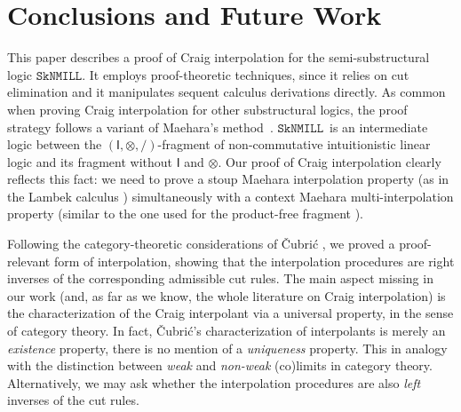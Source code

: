 \documentclass[sn-mathphys-num]{sn-jnl}%
\newcommand{\ot}{\otimes}
\newcommand{\unit}{\mathsf{I}}
\newcommand{\sls}{\slash}
\newcommand{\SkNMILL}{$\mathtt{SkNMILL}$}
\theoremstyle{thmstyleone}%
\theoremstyle{thmstyletwo}%
\theoremstyle{thmstylethree}%
\begin{document}
\section{Conclusions and Future Work}

This paper describes a proof of Craig interpolation for the semi-substructural logic \SkNMILL.
It employs proof-theoretic techniques, since it relies on cut elimination and it manipulates sequent calculus derivations directly.
As common when proving Craig interpolation for other substructural logics, the proof strategy follows a variant of Maehara's method~\cite{maehara1961}.
\SkNMILL~is an intermediate logic between the $(\unit,\ot,\sls)$-fragment of non-commutative intuitionistic linear logic and its fragment without $\unit$ and $\ot$.
Our proof of Craig interpolation clearly reflects this fact: we need to prove a stoup Maehara interpolation property (as in the Lambek calculus \cite{ono:proof:nonclassical:1998}) simultaneously with a context Maehara multi-interpolation property (similar to the one used for the product-free fragment \cite{Pentus1997}).

Following the category-theoretic considerations of {\v{C}}ubri{\'c} \cite{Cubric1994}, we proved a proof-relevant form of interpolation, showing that the interpolation procedures are right inverses of the corresponding admissible cut rules.
The main aspect missing in our work (and, as far as we know, the whole literature on Craig interpolation) is the characterization of the Craig interpolant via a universal property, in the sense of category theory.
In fact, {\v{C}}ubri{\'c}'s characterization of interpolants is merely an \emph{existence} property, there is no mention of a \emph{uniqueness} property.
This in analogy with the distinction between \emph{weak} and \emph{non-weak} (co)limits in category theory.
Alternatively, we may ask whether the interpolation procedures are also \emph{left} inverses of the cut rules.
\end{document}
